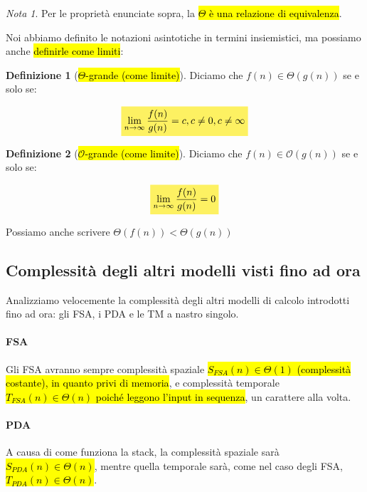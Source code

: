 \documentclass[a4paper,11pt,oneside]{article}
\theoremstyle{plain}
\theoremstyle{definition}
\newtheorem{defn}{Definizione}[section]
\theoremstyle{remark}
\newtheorem*{nota}{Nota}
\newcommand{\mhl}[1]{\colorbox{hlcolor}{$\displaystyle #1$}}
\begin{document}
\begin{nota}
  Per le proprietà enunciate sopra, la \hl{$\Theta$ è una relazione di
  equivalenza}.
\end{nota}

Noi abbiamo definito le notazioni asintotiche in termini insiemistici, ma
possiamo anche \hl{definirle come limiti}:

\begin{defn}[\hl{$\Theta$-grande (come limite)}]\label{def:theta-grande-lim}
  Diciamo che $f(n) \in \Theta(g(n))$ se e solo se:

  \begin{equation}
    \mhl{
      \lim_{n \to \infty} \frac{f(n)}{g(n)} = c , c \neq 0, c \neq \infty
    }
  \end{equation}
\end{defn}

\begin{defn}[\hl{$\mathcal{O}$-grande (come limite)}]\label{def:o-grande-lim}
  Diciamo che $f(n) \in \mathcal{O}(g(n))$ se e solo se:

  \begin{equation}
    \mhl{
      \lim_{n \to \infty} \frac{f(n)}{g(n)} = 0
    }
  \end{equation}

  Possiamo anche scrivere $\Theta(f(n)) < \Theta(g(n))$
\end{defn}

\subsection{Complessità degli altri modelli visti fino ad ora}\label{sec:comp-fsa-pda-tm}

Analizziamo velocemente la complessità degli altri modelli di calcolo introdotti
fino ad ora: gli FSA, i PDA e le TM a nastro singolo.

\paragraph{FSA} Gli FSA avranno sempre complessità spaziale \hl{$S_{FSA}(n) \in
\Theta(1)$ (complessità costante), in quanto privi di memoria}, e complessità
temporale \hl{$T_{FSA}(n) \in \Theta(n)$ poiché leggono l'input in sequenza}, un
carattere alla volta.

\paragraph{PDA} A causa di come funziona la stack, la complessità spaziale sarà
\hl{$S_{PDA}(n) \in \Theta(n)$}, mentre quella temporale sarà, come nel caso
degli FSA, \hl{$T_{PDA}(n) \in \Theta(n)$}.
\end{document}
